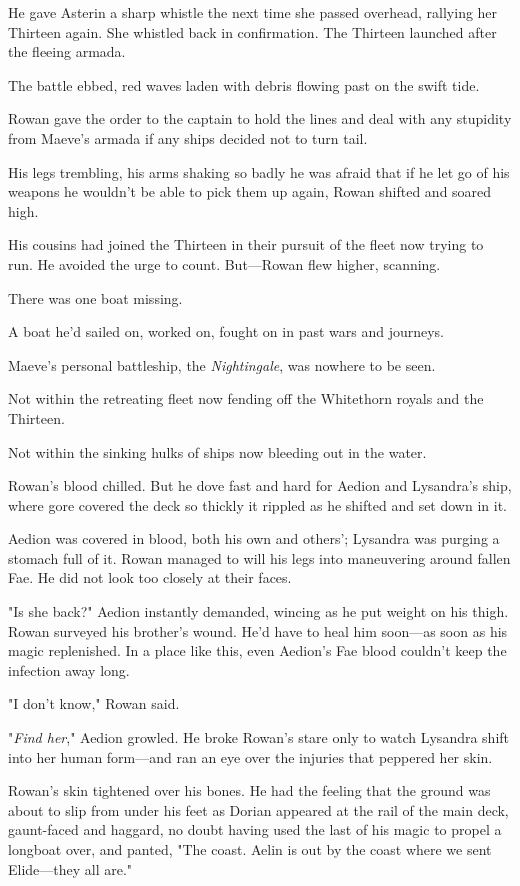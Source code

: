 He gave Asterin a sharp whistle the next time she passed overhead, rallying her Thirteen again. She whistled back in confirmation. The Thirteen launched after the fleeing armada.

The battle ebbed, red waves laden with debris flowing past on the swift tide.

Rowan gave the order to the captain to hold the lines and deal with any stupidity from Maeve's armada if any ships decided not to turn tail.

His legs trembling, his arms shaking so badly he was afraid that if he let go of his weapons he wouldn't be able to pick them up again, Rowan shifted and soared high.

His cousins had joined the Thirteen in their pursuit of the fleet now trying to run. He avoided the urge to count. But---Rowan flew higher, scanning.

There was one boat missing.

A boat he'd sailed on, worked on, fought on in past wars and journeys.

Maeve's personal battleship, the \emph{Nightingale}, was nowhere to be seen.

Not within the retreating fleet now fending off the Whitethorn royals and the Thirteen.

Not within the sinking hulks of ships now bleeding out in the water.

Rowan's blood chilled. But he dove fast and hard for Aedion and Lysandra's ship, where gore covered the deck so thickly it rippled as he shifted and set down in it.

Aedion was covered in blood, both his own and others'; Lysandra was purging a stomach full of it. Rowan managed to will his legs into maneuvering around fallen Fae. He did not look too closely at their faces.

"Is she back?" Aedion instantly demanded, wincing as he put weight on his thigh. Rowan surveyed his brother's wound. He'd have to heal him soon---as soon as his magic replenished. In a place like this, even Aedion's Fae blood couldn't keep the infection away long.

"I don't know," Rowan said.

"\emph{Find her}," Aedion growled. He broke Rowan's stare only to watch Lysandra shift into her human form---and ran an eye over the injuries that peppered her skin.

Rowan's skin tightened over his bones. He had the feeling that the ground was about to slip from under his feet as Dorian appeared at the rail of the main deck, gaunt-faced and haggard, no doubt having used the last of his magic to propel a longboat over, and panted, "The coast. Aelin is out by the coast where we sent Elide---they all are."

